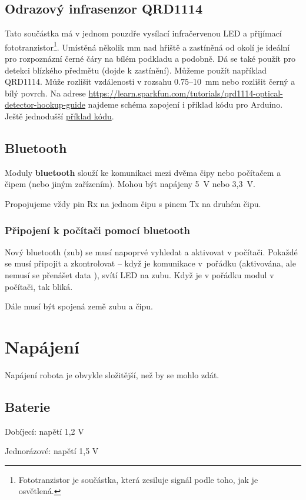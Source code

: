 \subsection{Odrazový infrasenzor QRD1114}

  \label{qrd1114} Tato součástka má v jednom pouzdře vysílací infračervenou LED a přijímací fototranzistor\footnote{Fototranzistor je součástka, která zesiluje signál podle toho, jak je osvětlená.}. Umístěná několik mm nad hřiště a zastíněná od okolí je ideální pro rozpoznázní  černé čáry na bílém podkladu a podobně. Dá se také použít pro detekci blízkého předmětu (dojde k zastínění).
Můžeme použít například QRD1114. Může rozlišit vzdálenosti v rozsahu 0.75--10~mm nebo rozlišit černý a bílý povrch.  
Na adrese
\url{https://learn.sparkfun.com/tutorials/qrd1114-optical-detector-hookup-guide} najdeme schéma zapojení i příklad kódu pro Arduino. Ještě jednodušší \hyperref[prog:qrd1114]{příklad kódu}.

\subsection{Bluetooth} 

\hypertarget{bluetooth}{} Moduly {\bf bluetooth} slouží ke komunikaci mezi dvěma čipy nebo počítačem a čipem (nebo jiným zařízením).
Mohou být napájeny 5~V nebo 3,3~V. 
\label{bluetooth} 

Propojujeme vždy pin Rx na jednom čipu s pinem Tx na druhém čipu. 

\subsubsection*{Připojení k počítači pomocí bluetooth}

Nový bluetooth (zub) se musí napoprvé vyhledat a aktivovat v počítači. 
Pokaždé se musí připojit a zkontrolovat -- když je komunikace v~pořádku (aktivována, ale nemusí se přenášet data ), svítí LED na zubu. 
Když je v pořádku modul v počítači, tak bliká.  

Dále musí být spojená země zubu a čipu.



\section{Napájení} %

Napájení robota je obvykle složitější, než by se mohlo zdát. 

\subsection{Baterie}

Dobíjecí: napětí 1,2 V~

Jednorázové: napětí 1,5 V~

